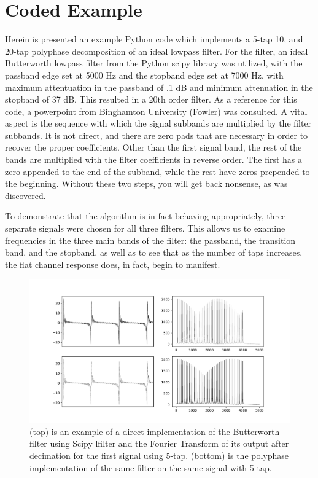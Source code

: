 \documentclass{report}
\begin{document}
\section{Coded Example}

Herein is presented an example Python code which implements a 5-tap 10, and 20-tap polyphase decomposition of an ideal lowpass filter.  For the filter, an ideal Butterworth lowpass filter from the Python scipy library was utilized, with the passband edge set at 5000 Hz and the stopband edge set at 7000 Hz, with maximum attentuation in the passband of .1 dB and minimum attenuation in the stopband of 37 dB.  This resulted in a 20th order filter.  As a reference for this code, a powerpoint from Binghamton University (Fowler) was consulted.  A vital aspect is  the sequence with which the signal subbands are multiplied by the filter subbands.  It is not direct, and there are zero pads that are necessary in order to recover the proper coefficients.  Other than the first signal band, the rest of the bands are multiplied with the filter coefficients in reverse order.  The first has a zero appended to the end of the subband, while the rest have zeros prepended to the beginning.  Without these two steps, you will get back nonsense, as was discovered.

To demonstrate that the algorithm is in fact behaving appropriately, three separate signals were chosen for all three filters.  This allows us to examine frequencies in the three main bands of the filter: the passband, the transition band, and the stopband, as well as to see that as the number of taps increases, the flat channel response does, in fact, begin to manifest.

\begin{figure}[!ht]
\includegraphics[scale=.45]{Figure_6.pdf}
\caption{(top) is an example of a direct implementation of the Butterworth filter using Scipy lfilter and the Fourier Transform of its output after decimation for the first signal using 5-tap. (bottom) is the polyphase implementation of the same filter on the same signal with 5-tap.}
\end{figure} 
\end{document}
